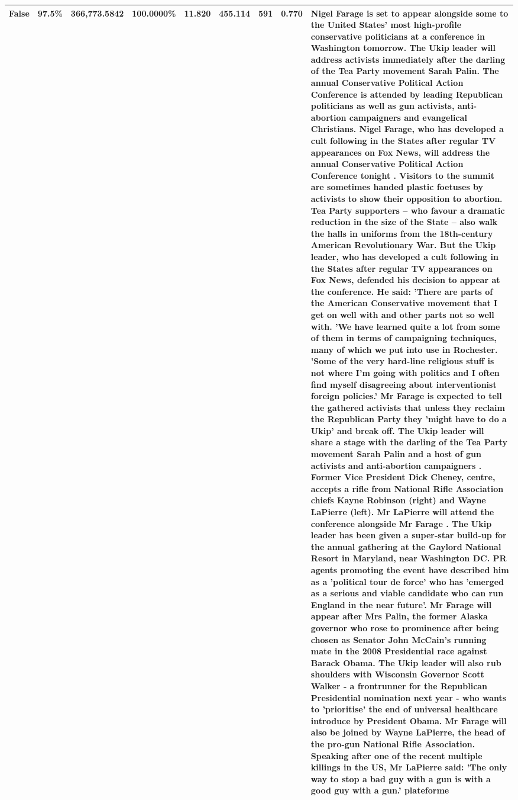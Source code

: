 \begin{table}[H]
\begin{tabular}{lllrlllll}
\cline{1-9}
False & 97.5\% & 366,773.5842 & \bfseries \color{red} 100.0000\% & 11.820 & 455.114 & 591 & 0.770 & Nigel Farage is set to appear alongside some to the United States' most high-profile conservative politicians at a conference in Washington tomorrow. The Ukip leader will address activists immediately after the darling of the Tea Party movement Sarah Palin. The annual Conservative Political Action Conference is attended by leading Republican politicians as well as gun activists, anti-abortion campaigners and evangelical Christians. Nigel Farage, who has developed a cult following in the States after regular TV appearances on Fox News, will address the annual Conservative Political Action Conference tonight . Visitors to the summit are sometimes handed plastic foetuses by activists to show their opposition to abortion. Tea Party supporters – who favour a dramatic reduction in the size of the State – also walk the halls in uniforms from the 18th-century American Revolutionary War. But the Ukip leader, who has developed a cult following in the States after regular TV appearances on Fox News, defended his decision to appear at the conference. He said: 'There are parts of the American Conservative movement that I get on well with and other parts not so well with. 'We have learned quite a lot from some of them in terms of campaigning techniques, many of which we put into use in Rochester. 'Some of the very hard-line religious stuff is not where I'm going with politics and I often find myself disagreeing about interventionist foreign policies.' Mr Farage is expected to tell the gathered activists that unless they reclaim the Republican Party they 'might have to do a Ukip' and break off. The Ukip leader will share a stage with the darling of the Tea Party movement Sarah Palin and a host of gun activists and anti-abortion campaigners . Former Vice President Dick Cheney, centre, accepts a rifle from National Rifle Association chiefs Kayne Robinson (right) and Wayne LaPierre (left). Mr LaPierre will attend the conference alongside Mr Farage . The Ukip leader has been given a super-star build-up for the annual gathering at the Gaylord National Resort in Maryland, near Washington DC. PR agents promoting the event have described him as a 'political tour de force' who has 'emerged as a serious and viable candidate who can run England in the near future'. Mr Farage will appear after Mrs Palin, the former Alaska governor who rose to prominence after being chosen as Senator John McCain's running mate in the 2008 Presidential race against Barack Obama. The Ukip leader will also rub shoulders with Wisconsin Governor Scott Walker - a frontrunner for the Republican Presidential nomination next year - who wants to 'prioritise' the end of universal healthcare introduce by President Obama. Mr Farage will also be joined by Wayne LaPierre, the head of the pro-gun National Rifle Association. Speaking after one of the recent multiple killings in the US, Mr LaPierre said: 'The only way to stop a bad guy with a gun is with a good guy with a gun.' plateforme \\
\cline{1-9}
\bottomrule
\end{tabular}
\end{table}
